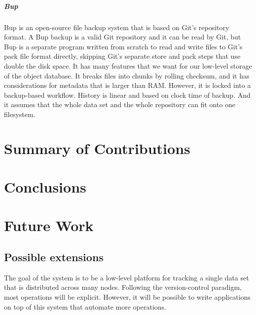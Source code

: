 \documentclass[12pt,a4paper,two-side]{book}
\begin{document}
\paragraph{Bup}

Bup \cite{bup_homepage} is an open-source file backup system that is based on
Git's repository format. A Bup backup is a valid Git repository and it can be
read by Git, but Bup is a separate program written from scratch to read and
write files to Git's pack file format directly, skipping Git's separate store
and pack steps that use double the disk space. It has many features that we want
for our low-level storage of the object database. It breaks files into chunks by
rolling checksum, and it has considerations for metadata that is larger than
RAM. However, it is locked into a backup-based workflow. History is linear and
based on clock time of backup. And it assumes that the whole data set and the
whole repository can fit onto one filesystem.









\chapter{Summary of Contributions}









\chapter{Conclusions}









\chapter{Future Work}


\section{Possible extensions}

The goal of the system is to be a low-level platform for tracking a single data
set that is distributed across many nodes. Following the version-control
paradigm, most operations will be explicit. However, it will be possible to
write applications on top of this system that automate more operations.
\end{document}
